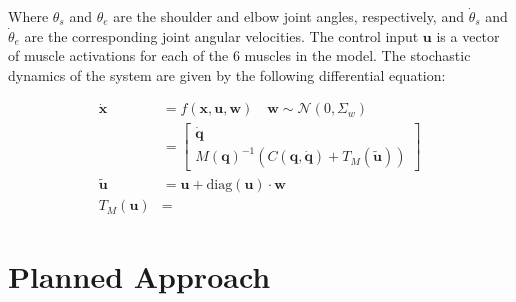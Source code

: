 \documentclass[table,12pt]{article}
\begin{document}
Where $\theta_s$ and $\theta_e$ are the shoulder and elbow joint angles, respectively, and $\dot{\theta}_s$ and $\dot{\theta}_e$ are the corresponding joint angular velocities. The control input $\mathbf{u}$ is a vector of muscle activations for each of the 6 muscles in the model. The stochastic dynamics of the system are given by the following differential equation:

\begin{align}
    \dot{\mathbf{x}} &= f(\mathbf{x}, \mathbf{u}, \mathbf{w}) \quad \mathbf{w} \sim \mathcal{N}(0, \Sigma_w) \\
    &= \begin{bmatrix}
        \dot{\mathbf{q}} \\
        M(\mathbf{q})^{-1} \left(C(\mathbf{q}, \dot{\mathbf{q}}) + T_M(\tilde{\mathbf{u}})\right)
    \end{bmatrix} \\
    \tilde{\mathbf{u}} &= \mathbf{u} + \text{diag}(\mathbf{u}) \cdot \mathbf{w} \\
    T_M(\mathbf{u}) &= 
\end{align}

\section{Planned Approach}
\end{document}
